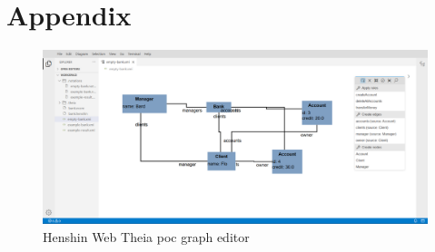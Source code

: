 \documentclass[conference,onecolumn]{IEEEtran}
\begin{document}
  

  \section{Appendix}
  \label{sec:appendix}

  \begin{figure}[H]
    \centering
    \includegraphics[width=1\textwidth]{poc}
    \caption{Henshin Web Theia \ac{poc} graph editor}
    \label{fig:poc}
  \end{figure}

  
  \printbibliography
\end{document}
